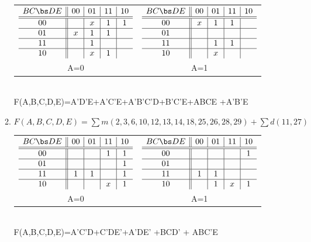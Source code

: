 \begin{enumerate}
\begin{enumerate}
\begin{solution}
{\begin{tabular}{cc}
$\begin{array} {c||c|c|c|c}
   B C \bs D E   & 00 & 01 & 11 & 10 \\ \hline \hline
       00        &    & x  & 1  & 1  \\ \hline
       01        & x  & 1  & 1  &    \\ \hline
       11        &    & 1  &    &    \\ \hline
       10        &    & x  & 1  &    \\
\end{array}$ &
$\begin{array} {c||c|c|c|c}
   B C \bs D E   & 00 & 01 & 11 & 10 \\ \hline \hline
       00        & x  & 1  & 1  &    \\ \hline
       01        &    &    &    &    \\ \hline
       11        &    & 1  & 1  &    \\ \hline
       10        &    & x  &    &    \\
\end{array}$ \\
A=0 & A=1 \\
\end{tabular} \\
F(A,B,C,D,E)=A'D'E+A'C'E+A'B'C'D+B'C'E+ABCE +A'B'E
} \end{solution}

\item $F(A,B,C,D,E)=\sum m(2,3,6,10,12,13,14,18,25,26,28,29)+\sum d(11,27)$

\begin{solution}{

\begin{tabular}{cc}
$\begin{array} {c||c|c|c|c}
   B C \bs D E   & 00 & 01 & 11 & 10 \\ \hline \hline
       00        &    &    & 1  & 1  \\ \hline
       01        &    &    &    & 1  \\ \hline
       11        & 1  & 1  &    & 1  \\ \hline
       10        &    &    & x  & 1  \\
\end{array}$ &
$\begin{array} {c||c|c|c|c}
   B C \bs D E   & 00 & 01 & 11 & 10 \\ \hline \hline
       00        &    &    &    & 1  \\ \hline
       01        &    &    &    &    \\ \hline
       11        & 1  & 1  &    &    \\ \hline
       10        &    & 1  & x  & 1  \\
\end{array}$ \\
A=0 & A=1 \\
\end{tabular} \\
F(A,B,C,D,E)=A'C'D+C'DE'+A'DE' +BCD' + ABC'E 
} \end{solution}


\end{enumerate}
\end{enumerate}
